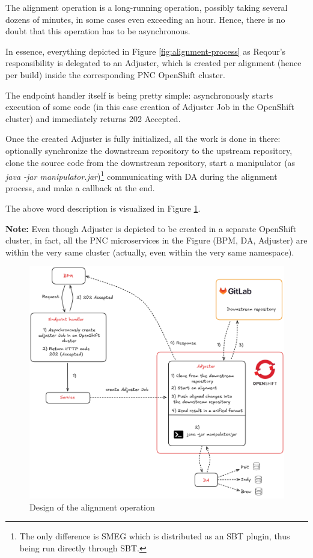 \documentclass[../main.tex]{subfiles}
\begin{document}
The alignment operation is a long-running operation, possibly taking several dozens of minutes, in some cases even exceeding an hour. Hence, there is no doubt that this operation has to be asynchronous.

In essence, everything depicted in Figure \ref{fig:alignment-process} as Reqour's responsibility is delegated to an Adjuster, which is created per alignment (hence per build) inside the corresponding PNC OpenShift cluster.

The endpoint handler itself is being pretty simple: asynchronously starts execution of some code (in this case creation of Adjuster Job in the OpenShift cluster) and immediately returns 202 Accepted.

Once the created Adjuster is fully initialized, all the work is done in there: optionally synchronize the downstream repository to the upstream repository, clone the source code from the downstream repository, start a manipulator (as \textit{java -jar manipulator.jar})\footnote{The only difference is SMEG which is distributed as an SBT plugin, thus being run directly through SBT.} communicating with DA during the alignment process, and make a callback at the end.

The above word description is visualized in Figure \ref{fig:alignment-design}.

\textbf{Note:} Even though Adjuster is depicted to be created in a separate OpenShift cluster, in fact, all the PNC microservices in the Figure (BPM, DA, Adjuster) are within the very same cluster (actually, even within the very same namespace).

\begin{figure}
  \begin{center}
    \includegraphics[width=\textwidth]{images/alignment-design.png}
  \end{center}
  \caption{Design of the alignment operation}
  \label{fig:alignment-design}
\end{figure}
\end{document}
